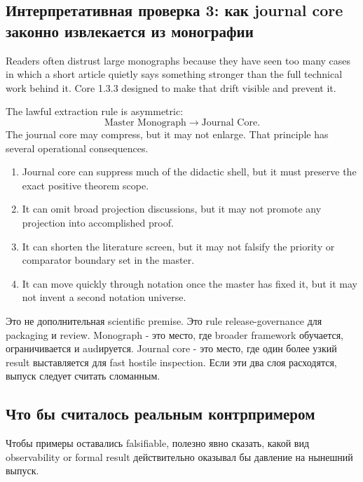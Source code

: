 \subsection{Интерпретативная проверка 3: как journal core законно извлекается из монографии}

Readers often distrust large monographs because they have seen too many cases
in which a short article quietly says something stronger than the full
technical work behind it. Core 1.3.3 designed to make that drift visible and
prevent it.

The lawful extraction rule is asymmetric:
\[
\text{Master Monograph} \longrightarrow \text{Journal Core}.
\]
The journal core may compress, but it may not enlarge. That principle has
several operational consequences.

\begin{enumerate}
\item Journal core can suppress much of the didactic shell, but it must
      preserve the exact positive theorem scope.
\item It can omit broad projection discussions, but it may not promote any
      projection into accomplished proof.
\item It can shorten the literature screen, but it may not falsify the
      priority or comparator boundary set in the master.
\item It can move quickly through notation once the master has fixed it, but
      it may not invent a second notation universe.
\end{enumerate}

Это не дополнительная scientific premise. Это rule release-governance для
packaging и review. Monograph - это место, где broader framework обучается,
ограничивается и audируется. Journal core - это место, где один более узкий
result выставляется для fast hostile inspection. Если эти два слоя расходятся,
выпуск следует считать сломанным.

\subsection{Что бы считалось реальным контрпримером}

Чтобы примеры оставались falsifiable, полезно явно сказать, какой вид
observability or formal result действительно оказывал бы давление на
нынешний выпуск.

